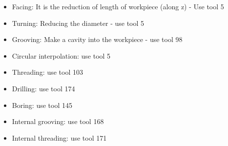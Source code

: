 \documentclass{article}
\begin{document}
\begin{itemize}
	\item Facing: It is the reduction of length of workpiece (along z) - Use tool 5
	\item Turning: Reducing the diameter - use tool 5
	\item Grooving: Make a cavity into the workpiece - use tool 98
	\item Circular interpolation: use tool 5
	\item Threading: use tool 103
	\item Drilling: use tool 174
	\item Boring: use tool 145
	\item Internal grooving: use tool 168
	\item Internal threading: use tool 171

\end{itemize}
\end{document}
